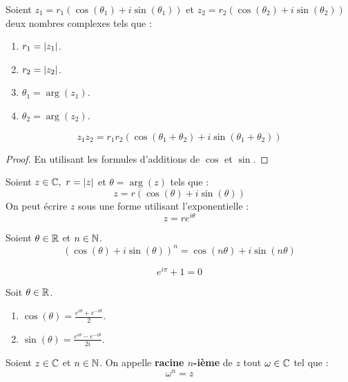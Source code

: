 \begin{proposition}
	Soient $z_1 = r_1 \left( \cos(\theta_1) + i \sin(\theta_1) \right)$ et $z_2 = r_2 \left( \cos(\theta_2) + i \sin(\theta_2) \right)$ deux nombres complexes tels que :
	\begin{enumerate}
			\item $r_1 = \abs{z_1}$.
			\item $r_2 = \abs{z_2}$.
			\item $\theta_1 = \arg(z_1)$.
			\item $\theta_2 = \arg(z_2)$.
		\end{enumerate}
	\[ z_1 z_2 = r_1 r_2 \left( \cos(\theta_1+\theta_2) + i \sin(\theta_1+ \theta_2) \right) \]
\end{proposition}

\begin{proof}
	En utilisant les formules d'additions de $\cos$ et $\sin$.
\end{proof}

\begin{definition}
	Soient $z \in \mathbb{C},\ r = \abs{z}$ et $\theta = \arg(z)$ tels que :
	\[ z = r (\cos(\theta) + i \sin(\theta)) \]
	On peut écrire $z$ sous une forme utilisant l'exponentielle :
	\[ z = re^{i \theta} \]
\end{definition}

\begin{proposition}
	Soient $\theta \in \mathbb{R}$ et $n \in \mathbb{N}$.
	\[ (\cos(\theta) + i \sin(\theta))^n = \cos(n \theta) + i \sin(n \theta) \]
\end{proposition}

\begin{proposition}
	\[ e^{i\pi} + 1 = 0 \]
\end{proposition}

\begin{proposition}
	Soit $\theta \in \mathbb{R}$.
	\begin{enumerate}
			\item $\cos(\theta) = \frac{e^{i\theta} + e^{-i\theta}}{2}$.
			\item $\sin(\theta) = \frac{e^{i\theta} - e^{-i\theta}}{2i}$.
		\end{enumerate}
\end{proposition}

\begin{definition}
	Soient $z \in \mathbb{C}$ et $n \in \mathbb{N}$. On appelle \textbf{racine $n$-ième} de $z$ tout $\omega \in \mathbb{C}$ tel que :
	\[ \omega^n = z \] 
\end{definition}

